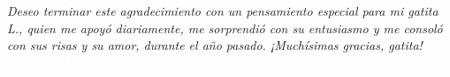 \begin{acknowledgements}
\vfill{}

%
%
    \emph{Deseo terminar este agradecimiento con un pensamiento especial para mi gatita \emph{L.}, quien me apoyó diariamente, me sorprendió con su entusiasmo y me consoló con sus risas y su amor, durante el año pasado. ¡Muchísimas gracias, gatita!}
    \textcolor{white}{$\heartsuit$ Te quiero, Lola, ¿quieres vivir conmigo?}

\end{acknowledgements}
